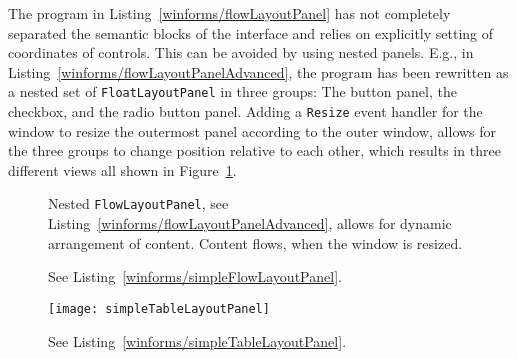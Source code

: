 The program in Listing~\ref{winforms/flowLayoutPanel} has not completely separated the semantic blocks of the interface and relies on explicitly setting of coordinates of controls. This can be avoided by using nested panels. E.g., in Listing~\ref{winforms/flowLayoutPanelAdvanced}, the program has been rewritten as a nested set of \lstinline{FloatLayoutPanel} in three groups: The button panel, the checkbox, and the radio button panel. Adding a \lstinline{Resize} event handler for the window to resize the outermost panel according to the outer window, allows for the three groups to change position relative to each other, which results in three different views all shown in Figure~\ref{fig:flowLayoutPanelAdvanced}.
%
%
%
%
\begin{figure}
  \centering
  \caption{Nested \lstinline!FlowLayoutPanel!, see Listing~\ref{winforms/flowLayoutPanelAdvanced}, allows for dynamic arrangement of content. Content flows, when the window is resized.}
  \label{fig:flowLayoutPanelAdvanced}
\end{figure}

%
%
\begin{figure}
  \centering
  \caption{See Listing~\ref{winforms/simpleFlowLayoutPanel}.}
  \label{fig: simpleFlowLayoutPanel}
\end{figure}

%
%
\begin{figure}
  \centering
  \texttt{[image: simpleTableLayoutPanel]}
  \caption{See Listing~\ref{winforms/simpleTableLayoutPanel}.}
  \label{fig: simpleTableLayoutPanel}
\end{figure}

